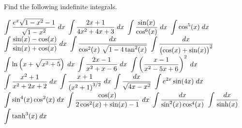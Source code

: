 \begin{Exercise} Find the following indefinite integrals.
	\begin{multicols}{2}
		\Question[difficulty = 1] $\displaystyle \int \dfrac{e^x \sqrt{1-x^2}-1}{\sqrt{1-x^2}}\; dx $
		\Question[difficulty = 1] $\displaystyle \int\dfrac{2x+1}{4x^2+4x+3}\; dx $
		\Question[difficulty = 1] $\displaystyle \int\dfrac{\sin (x)}{\cos^6 (x)} \; dx $
		\ifanalysis\Question[difficulty = 1]\fi\ifcalculus\Question[difficulty = 2]\fi$\displaystyle \int \cos^5 (x)\; dx$
		\Question[difficulty = 1] $\displaystyle \int \dfrac{\sin (x) - \cos (x)}{\sin (x) + \cos (x)}\; dx$
		\Question[difficulty = 1] $\displaystyle \int \dfrac{dx}{\cos^2 (x)\ \sqrt{1-4\tan^2 (x)}}$
		\Question[difficulty = 2] $\displaystyle \int\dfrac{dx}{\left(\cos (x)+\sin (x)\right)^2}$
		\Question[difficulty = 1] $\displaystyle \int\ln\left(x+\sqrt{x^2+5}\right)\;dx$
		\Question[difficulty = 1] $\displaystyle \int \dfrac{2x-1}{x^2+x-6}\; dx$ 
		\Question[difficulty = 2] $\displaystyle \int \left(\dfrac{x-1}{x^2-5x+6}\right)^2\; dx$ 
		\Question[difficulty = 1] $\displaystyle \int \dfrac{x^2+1}{x^2+2x+2}\; dx$
		\ifanalysis\Question[difficulty = 1]\fi\ifcalculus\Question[difficulty = 2]\fi $\displaystyle \int\dfrac{x+1}{\left(x^2+1\right)^{3/2}}\;dx$
		\Question[difficulty = 2] $\displaystyle \int\dfrac{dx}{\sqrt{4x-x^2}}$
		\ifanalysis\Question[difficulty = 1]\fi\ifcalculus\Question[difficulty = 2]\fi $\displaystyle \int e^{2x} \sin (4x) \; dx$
		\Question[difficulty = 2] $\displaystyle \int \sin^4(x) \cos^2(x)  \; dx$ %
		\Question[difficulty = 2] $\ds \int \dfrac{\cos(x)}{2\cos^2(x) + \sin(x) -1}\ dx$
		\Question[difficulty = 2] $\displaystyle \int \dfrac{dx}{\sin^2(x) \cos^4(x)}$
    	\ifanalysis
    		\Question[difficulty = 2] $\displaystyle \int \dfrac{dx}{\sinh(x)}$
    		\Question[difficulty = 2] $\displaystyle \int \tanh^3 (x) \; dx$
    	\fi
    	\EndCurrentQuestion
		\end{multicols}
\end{Exercise}

